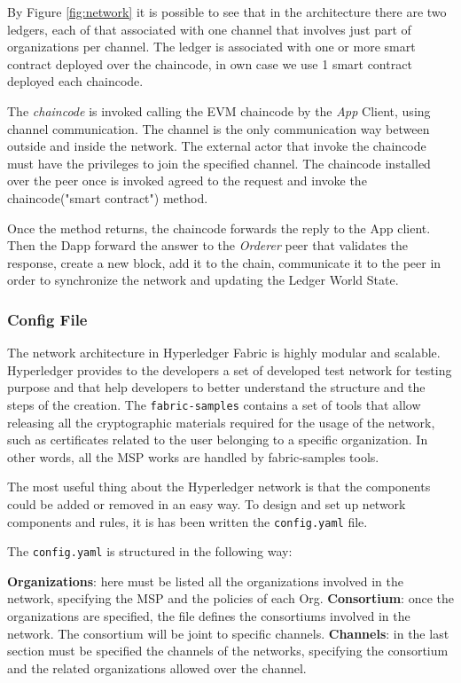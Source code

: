 By Figure \ref{fig:network} it is possible to see that in the architecture there are two ledgers, each of that 
associated with one channel that involves just part of organizations per channel. The ledger is associated with 
one or more smart contract deployed over the chaincode, in own case we use 1 smart contract deployed each chaincode. 

The \textit{chaincode} is invoked calling the EVM chaincode by the \textit{App} Client, using channel communication.
The channel is the only communication way between outside and inside the network. The external actor that invoke the chaincode
must have the privileges to join the specified channel. 
The chaincode installed over the peer once is invoked agreed to the request and invoke the chaincode("smart contract")
method. 

Once the method returns, the chaincode forwards the reply to the App client. Then the Dapp forward the
answer to the \textit{Orderer} peer that validates the response, create a new block, add it to the chain,
communicate it to the peer in order to synchronize the network and updating the Ledger World State.

\subsubsection{Config File}

The network architecture in Hyperledger Fabric is highly modular and scalable. Hyperledger provides to the developers a set of developed 
test network\cite{fabric-sample} for testing purpose and that help developers to better understand
the structure and the steps of the creation. The \texttt{fabric-samples} contains a set of tools that allow releasing all the cryptographic
materials required for the usage of the network, such as certificates related to the user belonging to a specific organization.
In other words, all the MSP works are handled by fabric-samples tools. 
\bigskip

The most useful thing about the Hyperledger network is that the components could be added or removed in an easy way.
To design and set up network components and rules, it is has been written the \texttt{config.yaml} file.

The \texttt{config.yaml} is structured in the following way:
\begin{outline}
    \1 \textbf{Organizations}: here must be listed all the organizations involved in the network, specifying the MSP and
    the policies of each Org. 
    \1 \textbf{Consortium}: once the organizations are specified, the file defines the consortiums involved in the network.
    The consortium will be joint to specific channels. 
    \1 \textbf{Channels}: in the last section must be specified the channels of the networks, specifying the consortium
    and the related organizations allowed over the channel. 

\end{outline}

